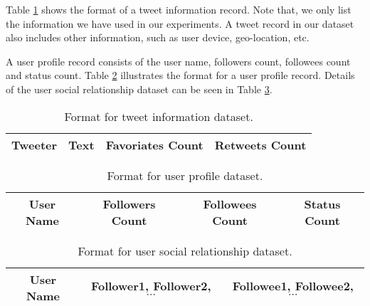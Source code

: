 Table \ref{tab:tweet information} shows the format of a tweet information record. Note that, we only list the information we have used in our experiments. A tweet record in our dataset also includes other information, such as user device, geo-location, etc. 

A user profile record consists of the user name, followers count, followees count and status count. Table \ref{tab:user profile} illustrates the format for a user profile record. Details of the user social relationship dataset can be seen in Table \ref{tab:social relationship}.

\begin{table}[htpb]
\centering
\begin{tabular}{|c|c|c|c|}
\hline
Tweeter  & Text  & Favoriates Count & Retweets Count \\
\hline
\end{tabular}
\vspace{0.01 in}
\caption{Format for tweet information dataset.}
\label{tab:tweet information}
\end{table}

\begin{table}[htpb]
\centering
\begin{tabular}{|c|c|c|c|}
\hline
User Name & Followers Count & Followees Count & Status Count \\
\hline
\end{tabular}
\vspace{0.01 in}
\caption{Format for user profile dataset.}
\label{tab:user profile}
\end{table}

\begin{table}[htpb]
\centering
\begin{tabular}{|c|c|c|}
\hline
User Name & Follower1, Follower2, $\cdots$ & Followee1, Followee2, $\cdots$ \\
\hline
\end{tabular}
\vspace{0.01 in}
\caption{Format for user social relationship dataset.}
\label{tab:social relationship}
\end{table}